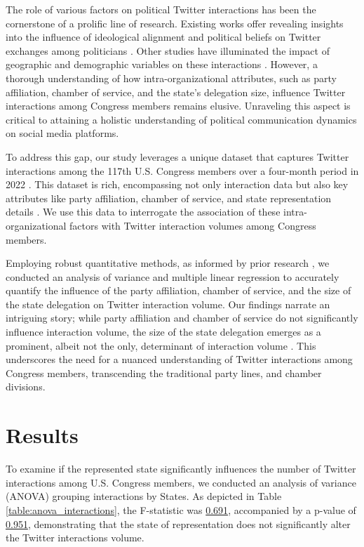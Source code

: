 \documentclass[11pt]{article}
\begin{document}
The role of various factors on political Twitter interactions has been the cornerstone of a prolific line of research. Existing works offer revealing insights into the influence of ideological alignment and political beliefs on Twitter exchanges among politicians \cite{Theocharis2020TheDO, Lu2019TheEO}. Other studies have illuminated the impact of geographic and demographic variables on these interactions \cite{Pablo2014TowardAE, Henn2014SocialDI}. However, a thorough understanding of how intra-organizational attributes, such as party affiliation, chamber of service, and the state's delegation size, influence Twitter interactions among Congress members remains elusive. Unraveling this aspect is critical to attaining a holistic understanding of political communication dynamics on social media platforms.

To address this gap, our study leverages a unique dataset that captures Twitter interactions among the 117th U.S. Congress members over a four-month period in 2022 \cite{Hemphill2013WhatsCD, Barber2019WhoLW}. This dataset is rich, encompassing not only interaction data but also key attributes like party affiliation, chamber of service, and state representation details \cite{Peng2016FollowerFolloweeNC}. We use this data to interrogate the association of these intra-organizational factors with Twitter interaction volumes among Congress members.

Employing robust quantitative methods, as informed by prior research \cite{VanderWeele2014OnTC, Stewart2000TheIO, Hu2015PredictingUE}, we conducted an analysis of variance and multiple linear regression to accurately quantify the influence of the party affiliation, chamber of service, and the size of the state delegation on Twitter interaction volume. Our findings narrate an intriguing story; while party affiliation and chamber of service do not significantly influence interaction volume, the size of the state delegation emerges as a prominent, albeit not the only, determinant of interaction volume \cite{Walraven2009AMO,Anderson2017SocialMS}. This underscores the need for a nuanced understanding of Twitter interactions among Congress members, transcending the traditional party lines, and chamber divisions.

\section*{Results}

To examine if the represented state significantly influences the number of Twitter interactions among U.S. Congress members, we conducted an analysis of variance (ANOVA) grouping interactions by States. As depicted in Table \ref{table:anova_interactions}, the F-statistic was \hyperlink{A0a}{0.691}, accompanied by a p-value of \hyperlink{A0b}{0.951}, demonstrating that the state of representation does not significantly alter the Twitter interactions volume.
\end{document}
